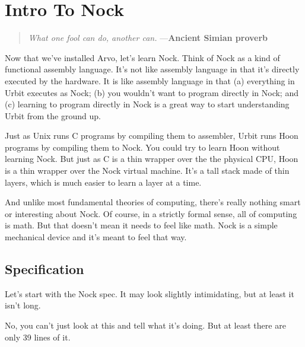 \chapter{Intro To Nock}

\begin{quote}
\noindent \emph{What one fool can do, another can.}
\medskip \newline
\noindent ---\textbf{Ancient Simian proverb}
\end{quote}

\noindent Now that we've installed Arvo, let's learn Nock. Think of Nock as a kind of functional assembly language.  It's
not like assembly language in that it's directly executed by the
hardware.  It is like assembly language in that (a) everything in
Urbit executes as Nock; (b) you wouldn't want to program directly
in Nock; and (c) learning to program directly in Nock is a great
way to start understanding Urbit from the ground up.

Just as Unix runs C programs by compiling them to assembler,
Urbit runs Hoon programs by compiling them to Nock.  You could
try to learn Hoon without learning Nock.  But just as C is a thin
wrapper over the the physical CPU, Hoon is a thin wrapper over
the Nock virtual machine.  It's a tall stack made of thin layers,
which is much easier to learn a layer at a time.

And unlike most fundamental theories of computing, there's really
nothing smart or interesting about Nock.  Of course, in a
strictly formal sense, all of computing is math.  But that
doesn't mean it needs to feel like math.  Nock is a simple
mechanical device and it's meant to feel that way.

\section{Specification}

Let's start with the Nock spec.  It may look slightly
intimidating, but at least it isn't long.

No, you can't just look at this and tell what it's doing.
But at least there are only 39 lines of it.

